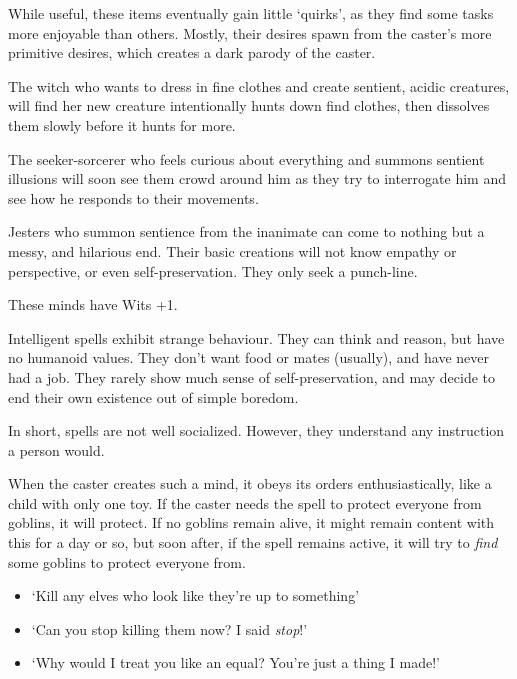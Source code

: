 \begin{multicols}{2}
While useful, these items eventually gain little `quirks', as they find some tasks more enjoyable than others.
Mostly, their desires spawn from the caster's more primitive desires, which creates a dark parody of the caster.

\begin{exampletext}
The witch who wants to dress in fine clothes and create sentient, acidic creatures, will find her new creature intentionally hunts down find clothes, then dissolves them slowly before it hunts for more.

The seeker-sorcerer who feels curious about everything and summons sentient illusions will soon see them crowd around him as they try to interrogate him and see how he responds to their movements.

Jesters who summon sentience from the inanimate can come to nothing but a messy, and hilarious end.
Their basic creations will not know empathy or perspective, or even self-preservation.
They only seek a punch-line.

\end{exampletext}

These minds have Wits +1.


Intelligent spells exhibit strange behaviour.
They can think and reason, but have no humanoid values.
They don't want food or mates (usually), and have never had a job.
They rarely show much sense of self-preservation, and may decide to end their own existence out of simple boredom.

In short, spells are not well socialized.
However, they understand any instruction a person would.

When the caster creates such a mind, it obeys its orders enthusiastically, like a child with only one toy.
If the caster needs the spell to protect everyone from goblins, it will protect.
If no goblins remain alive, it might remain content with this for a day or so, but soon after, if the spell remains active, it will try to \emph{find} some goblins to protect everyone from.

\begin{itemize}
  \item
    `Kill any elves who look like they're up to something'
  \item
    `Can you stop killing them now?
    I said \emph{stop}!'
  \item
    `Why would I treat you like an equal?
    You're just a thing I made!'
\end{itemize}


\end{multicols}
